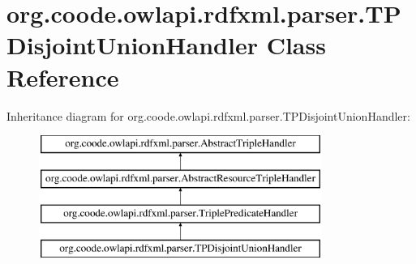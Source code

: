 \hypertarget{classorg_1_1coode_1_1owlapi_1_1rdfxml_1_1parser_1_1_t_p_disjoint_union_handler}{\section{org.\-coode.\-owlapi.\-rdfxml.\-parser.\-T\-P\-Disjoint\-Union\-Handler Class Reference}
\label{classorg_1_1coode_1_1owlapi_1_1rdfxml_1_1parser_1_1_t_p_disjoint_union_handler}
}
Inheritance diagram for org.\-coode.\-owlapi.\-rdfxml.\-parser.\-T\-P\-Disjoint\-Union\-Handler\-:\begin{figure}[H]
\begin{center}
\leavevmode
\includegraphics[height=4.000000cm]{classorg_1_1coode_1_1owlapi_1_1rdfxml_1_1parser_1_1_t_p_disjoint_union_handler}
\end{center}
\end{figure}
